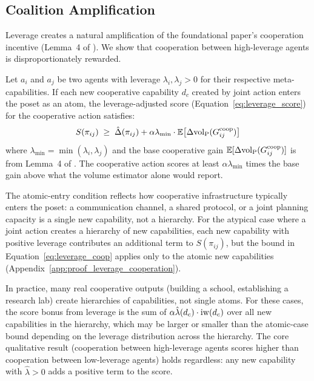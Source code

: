 \subsection{Coalition Amplification}
\label{sec:coalition_amplification}

Leverage creates a natural amplification of the foundational paper's
cooperation incentive (Lemma~4 of \citet{lasser2026gfm}). We show that
cooperation between high-leverage agents is disproportionately rewarded.

\begin{proposition}
\label{prop:leverage_cooperation}
Let $a_i$ and $a_j$ be two agents with leverage $\lambda_i, \lambda_j > 0$ for
    their respective meta-capabilities. If each new cooperative capability
    $d_c$ created by joint action enters the poset as an atom, the
    leverage-adjusted score (Equation~\eqref{eq:leverage_score}) for the
    cooperative action satisfies:
\begin{equation}
\label{eq:leverage_coop}
S(\pi_{ij}) \;\geq\; \hat{\Delta}(\pi_{ij})
  + \alpha \lambda_{\min}
  \cdot \mathbb{E}\bigl[\Delta {\operatorname{vol}_{\mathrm{P}}}(G^{\mathrm{coop}}_{ij})\bigr]
\end{equation}
where $\lambda_{\min} = \min(\lambda_i, \lambda_j)$ and the base cooperative
    gain $\mathbb{E}[\Delta {\operatorname{vol}_{\mathrm{P}}}(G^{\mathrm{coop}}_{ij})]$ is from Lemma~4
    of \citet{lasser2026gfm}. The cooperative action scores at least
    $\alpha \lambda_{\min}$ times the base gain above what the volume estimator
    alone would report.
\end{proposition}

The atomic-entry condition reflects how cooperative infrastructure typically
enters the poset: a communication channel, a shared protocol, or a joint
planning capacity is a single new capability, not a hierarchy. For the
atypical case where a joint action creates a hierarchy of new capabilities,
each new capability with positive leverage contributes an additional term to
$S(\pi_{ij})$, but the bound in Equation~\eqref{eq:leverage_coop} applies
only to the atomic new capabilities
(Appendix~\ref{app:proof_leverage_cooperation}).

In practice, many real cooperative outputs (building a school, establishing a
research lab) create hierarchies of capabilities, not single atoms. For these
cases, the score bonus from leverage is the sum of
$\alpha \hat{\lambda}(d_c) \cdot \operatorname{iw}(d_c)$ over all new capabilities in the
hierarchy, which may be larger or smaller than the atomic-case bound depending
on the leverage distribution across the hierarchy. The core qualitative
result (cooperation between high-leverage agents scores higher than
cooperation between low-leverage agents) holds regardless: any new capability
with $\hat{\lambda} > 0$ adds a positive term to the score.

